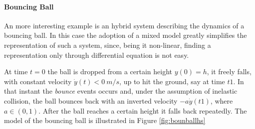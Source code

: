 \paragraph{Bouncing Ball} An more interesting example is an hybrid system describing the dynamics of a bouncing ball. In this case the adoption of a mixed model greatly simplifies the representation of such a system, since, being it non-linear, finding a representation only through differential equation is not easy.
\par At time $t=0$ the ball is dropped from a certain height $y(0)=h$, it freely falls, with constant velocity $\dot{y}(t) < 0\: m/s$, up to hit the ground, say at time $t1$. In that instant the \textit{bounce} events occurs and, under the assumption of inelastic collision, the ball bounces back with an inverted velocity $-a \dot{y}(t1)$, where $a \in (0,1)$. After the ball reaches a certain height it falls back  repeatedly. The model of the bouncing ball is illustrated in Figure \ref{fig:bounballhs}

